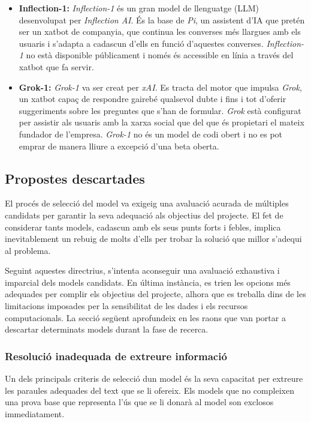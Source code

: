 \begin{itemize}
  \item \textbf{Inflection-1:} \textit{Inflection-1} és un gran model de llenguatge (LLM) desenvolupat per \textit{Inflection AI}. És la base de \textit{Pi}, un assistent d'IA que pretén ser un xatbot de companyia, que continua les converses més llargues amb els usuaris i s'adapta a cadascun d'ells en funció d'aquestes converses. \textit{Inflection-1} no està disponible públicament i només és accessible en línia a través del xatbot que fa servir.
  \item \textbf{Grok-1:} \textit{Grok-1} va ser creat per \textit{xAI}. Es tracta del motor que impulsa \textit{Grok}, un xatbot capaç de respondre gairebé qualsevol dubte i fins i tot d'oferir suggeriments sobre les preguntes que s'han de formular. \textit{Grok} està configurat per assistir als usuaris amb la xarxa social que del que és propietari el mateix fundador de l'empresa. \textit{Grok-1} no és un model de codi obert i no es pot emprar de manera lliure a excepció d'una beta oberta.
\end{itemize}

\subsection{Propostes descartades}
El procés de selecció del model va exigeig una avaluació acurada de múltiples candidats per garantir la seva adequació als objectius del projecte. El fet de considerar tants models, cadascun amb els seus punts forts i febles, implica inevitablement un rebuig de molts d'ells per trobar la solució que millor s'adequi al problema. 

Seguint aquestes directrius, s'intenta aconseguir una avaluació exhaustiva i imparcial dels models candidats. En última instància, es trien les opcions més adequades per complir els objectius del projecte, alhora que es treballa dins de les limitacions imposades per la sensibilitat de les dades i els recursos computacionals. La secció següent aprofundeix en les raons que van portar a descartar determinats models durant la fase de recerca.

\subsubsection{Resolució inadequada de extreure informació}
Un dels principals criteris de selecció dun model és la seva capacitat per extreure les paraules adequades del text que se li ofereix. Els models que no compleixen una prova base que representa l'ús que se li donarà al model son exclosos immediatament. 

